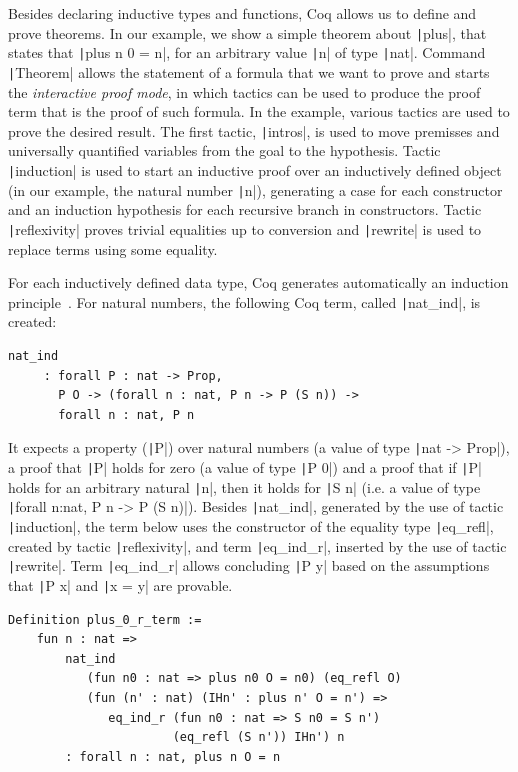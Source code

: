 \documentclass[review]{elsarticle}
\newcommand{\coq}[1]{\texttt|#1|}
\theoremstyle{definition}
\begin{document}
Besides declaring inductive types and functions, Coq allows us to
define and prove theorems. In our example, we show a simple theorem
about \coq{plus}, that states that
\coq{plus n 0 = n}, for an arbitrary value \coq{n} of type
\coq{nat}. Command \coq{Theorem} allows the statement of a
formula that we want to prove and starts the \emph{interactive proof mode}, 
in which tactics can be used to produce the proof term that
is the proof of such formula. In the example, various tactics are
used to prove the desired result.  The first tactic, \coq{intros}, is
used to move premisses and universally quantified variables from the
goal to the hypothesis. Tactic \coq{induction} is used to start an inductive
proof over an inductively defined object (in our example,
the natural number \coq{n}), generating a case for each constructor and
an induction hypothesis for each recursive branch in constructors.
Tactic \coq{reflexivity} proves trivial equalities up to conversion and
\coq{rewrite} is used to replace terms using some equality. 

For each inductively defined data type,
Coq generates automatically an induction principle~\cite[Chapter
14]{Bertot2010}. For natural numbers, the following Coq term, called
\coq{nat_ind}, is created: 
\begin{verbatim}
nat_ind
     : forall P : nat -> Prop,
       P O -> (forall n : nat, P n -> P (S n)) ->
       forall n : nat, P n
\end{verbatim}
It expects a property (\coq{P}) over natural numbers (a value of type
\coq{nat -> Prop}), a proof that \coq{P} holds for zero (a value of
type \coq{P 0}) and a proof that if \coq{P} holds for an arbitrary
natural \coq{n}, then it holds for \coq{S n} (i.e. a value of type
\coq{forall n:nat, P n -> P (S n)}). Besides \coq{nat_ind}, generated by
the use of tactic \coq{induction}, the term below 
uses the constructor of the equality
type \coq{eq_refl}, created by tactic \coq{reflexivity}, and term
\coq{eq_ind_r}, inserted by the use of tactic \coq{rewrite}. Term
\coq{eq_ind_r} allows concluding \coq{P y} based on the assumptions
that \coq{P x} and \coq{x = y} are provable.

\begin{verbatim}
Definition plus_0_r_term :=
	fun n : nat =>
		nat_ind
		   (fun n0 : nat => plus n0 O = n0) (eq_refl O)
		   (fun (n' : nat) (IHn' : plus n' O = n') =>
		      eq_ind_r (fun n0 : nat => S n0 = S n')
		               (eq_refl (S n')) IHn') n
		: forall n : nat, plus n O = n
\end{verbatim}  
\end{document}
